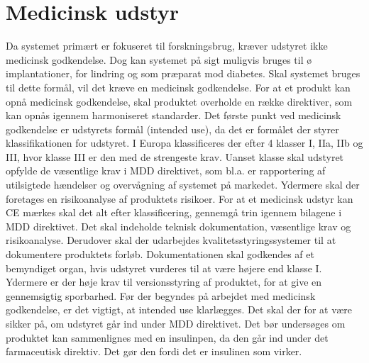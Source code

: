 \section{Medicinsk udstyr}
 Da systemet primært er fokuseret til forskningsbrug, kræver udstyret ikke medicinsk godkendelse. Dog kan systemet på sigt muligvis bruges til ø implantationer, for lindring og som præparat mod diabetes. Skal systemet bruges til dette formål, vil det kræve en medicinsk godkendelse. For at et produkt kan opnå medicinsk godkendelse, skal produktet overholde en række direktiver, som kan opnås igennem harmoniseret standarder. Det første punkt ved medicinsk godkendelse er udstyrets formål (intended use), da det er formålet der styrer klassifikationen for udstyret. I Europa klassificeres der efter 4 klasser I, IIa, IIb og III, hvor klasse III er den med de strengeste krav. Uanset klasse skal udstyret opfylde de væsentlige krav i MDD direktivet, som bl.a. er rapportering af utilsigtede hændelser og overvågning af systemet på markedet. Ydermere skal der foretages en risikoanalyse af produktets risikoer. For at et medicinsk udstyr kan CE mærkes 
 skal det alt efter klassificering, gennemgå trin igennem bilagene i MDD direktivet. Det skal indeholde teknisk dokumentation, væsentlige krav og risikoanalyse. Derudover skal der udarbejdes kvalitetsstyringssystemer til at dokumentere produktets forløb. Dokumentationen skal godkendes af et bemyndiget organ, hvis udstyret vurderes til at være højere end klasse I. Ydermere er der høje krav til versionsstyring af produktet, for at give en gennemsigtig sporbarhed. Før der begyndes på arbejdet med medicinsk godkendelse, er det vigtigt, at intended use klarlægges. Det skal der for at være sikker på, om udstyret går ind under MDD direktivet. Det bør undersøges om produktet kan sammenlignes med en insulinpen, da den går ind under det farmaceutisk direktiv. Det gør den fordi det er insulinen som virker. 